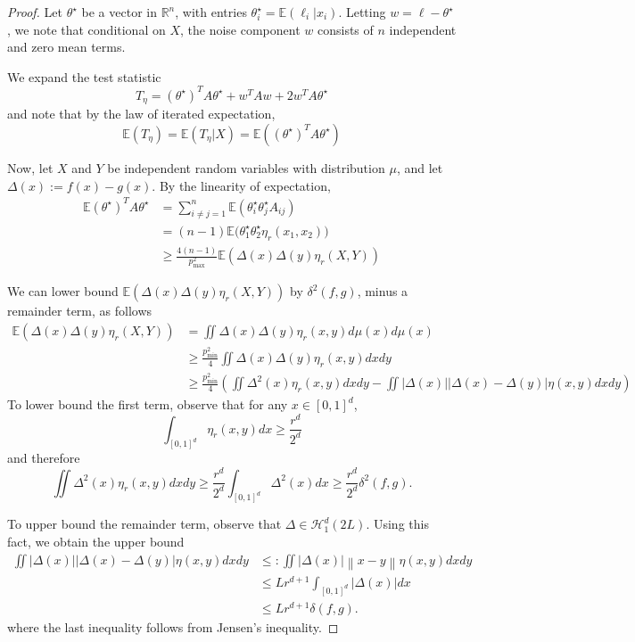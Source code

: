 \documentclass{article}
\newcommand{\Reals}{\mathbb{R}}
\newcommand{\norm}[1]{\left\lVert#1\right\rVert}
\newcommand{\abs}[1]{\left \lvert #1 \right \rvert}
\newcommand{\1}{\mathbb{I}}
\newcommand{\thetast}{\theta^{\star}}
\newcommand{\Ebb}{\mathbb{E}}
\theoremstyle{alden}
\theoremstyle{aldenthm}
\theoremstyle{definition}
\theoremstyle{remark}
\begin{document}
\begin{proof}
	Let $\thetast$ be a vector in $\Reals^{n}$, with entries $ \thetast_i = \Ebb(\ell_i|x_i)$. Letting $w = \ell - \thetast$, we note that conditional on $X$, the noise component $w$ consists of $n$ independent and zero mean terms.
	
	We expand the test statistic
	\begin{equation*}
	T_{\eta} = (\thetast)^T A \thetast + w^T A w + 2 w^T A \thetast
	\end{equation*}
	and note that by the law of iterated expectation, 
	\begin{equation*}
	\Ebb(T_{\eta}) = \Ebb(T_{\eta}|X) = \Ebb\left( (\thetast)^T A \thetast \right)
	\end{equation*}
	
	Now, let $X$ and $Y$ be independent random variables with distribution $\mu$, and let $\Delta(x) := f(x) - g(x)$. By the linearity of expectation,
	\begin{align*}
	\Ebb (\thetast)^T A \thetast & = \sum_{i \neq j = 1}^{n} \Ebb( \thetast_i \thetast_j A_{ij}) \\
	& = (n - 1) \Ebb \bigl(\thetast_1 \thetast_2 \eta_r(x_1, x_2) \bigr) \\
	& \geq \frac{4(n - 1)}{p_{\max}^2} \Ebb(\Delta(x) \Delta(y) \eta_r(X,Y))
	\end{align*} 
	
	We can lower bound $\Ebb(\Delta(x) \Delta(y) \eta_r(X,Y))$ by $\delta^2(f,g)$, minus a remainder term, as follows
	\begin{align*}
	\Ebb(\Delta(x) \Delta(y) \eta_r(X,Y)) & = \iint \Delta(x) \Delta(y) \eta_r(x,y) d\mu(x) d\mu(x) \\
	& \geq \frac{p_{\min}^2}{4} \iint \Delta(x) \Delta(y) \eta_r(x,y) dx dy \\
	& \geq \frac{p_{\min}^2}{4} \left( \iint \Delta^2(x) \eta_r(x,y) dx dy - \iint \abs{\Delta(x)} \abs{\Delta(x) - \Delta(y)} \eta(x,y) dx dy \right)
	\end{align*}
	To lower bound the first term, observe that for any $x \in [0,1]^d$,
	\begin{equation*}
	\int_{[0,1]^d} \eta_r(x,y) dx \geq \frac{r^d}{2^d}
	\end{equation*}
	and therefore
	\begin{equation*}
	\iint \Delta^2(x) \eta_r(x,y) dx dy \geq \frac{r^d}{2^d} \int_{[0,1]^d} \Delta^2(x) dx \geq \frac{r^d}{2^d} \delta^2(f,g).
	\end{equation*}
	
	To upper bound the remainder term, observe that $\Delta \in \mathcal{H}_{1}^{d}(2L)$. Using this fact, we obtain the upper bound
	\begin{align*}
	\iint \abs{\Delta(x)} \abs{\Delta(x) - \Delta(y)} \eta(x,y) dx dy & \leq : \iint \abs{\Delta(x)} \norm{x - y} \eta(x,y) dx dy \\
	& \leq L r^{d + 1} \int_{[0,1]^d} \abs{\Delta(x)} dx \\
	& \leq L r^{d + 1} \delta(f,g).
	\end{align*}
	where the last inequality follows from Jensen's inequality.
\end{proof}
\end{document}
